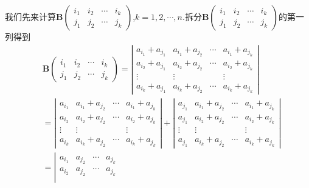 \documentclass[lang=cn,newtx,10pt,scheme=chinese]{elegantbook}
\begin{document}
\begin{solution}
    我们先来计算\(\boldsymbol{B}\left(\begin{matrix}
    i_1 & i_2 & \cdots & i_k\\
    j_1 & j_2 & \cdots & j_k
    \end{matrix}\right)\),\(k = 1,2,\cdots,n\).拆分\(\boldsymbol{B}\left(\begin{matrix}
    i_1 & i_2 & \cdots & i_k\\
    j_1 & j_2 & \cdots & j_k
    \end{matrix}\right)\)的第一列得到
    \begin{align*}
        &\boldsymbol{B}\left(\begin{matrix}
    i_1 & i_2 & \cdots & i_k\\
    j_1 & j_2 & \cdots & j_k
    \end{matrix}\right) = \left|\begin{matrix}
    a_{i_1} + a_{j_1} & a_{i_1} + a_{j_2} & \cdots & a_{i_1} + a_{j_k}\\
    a_{i_2} + a_{j_1} & a_{i_2} + a_{j_2} & \cdots & a_{i_2} + a_{j_k}\\
    \vdots & \vdots &  & \vdots\\
    a_{i_k} + a_{j_1} & a_{i_k} + a_{j_2} & \cdots & a_{i_k} + a_{j_k}
\end{matrix}\right|
    \\
    &=\left|\begin{matrix}
    a_{i_1} & a_{i_1} + a_{j_2} & \cdots & a_{i_1} + a_{j_k}\\
    a_{i_2} & a_{i_2} + a_{j_2} & \cdots & a_{i_2} + a_{j_k}\\
    \vdots & \vdots &  & \vdots\\
    a_{i_k} & a_{i_k} + a_{j_2} & \cdots & a_{i_k} + a_{j_k}
    \end{matrix}\right| + \left|\begin{matrix}
    a_{j_1} & a_{i_1} + a_{j_2} & \cdots & a_{i_1} + a_{j_k}\\
    a_{j_1} & a_{i_2} + a_{j_2} & \cdots & a_{i_2} + a_{j_k}\\
    \vdots & \vdots &  & \vdots\\
    a_{j_1} & a_{i_k} + a_{j_2} & \cdots & a_{i_k} + a_{j_k}
    \end{matrix}\right|
    \\
    &=\left|\begin{matrix}
    a_{i_1} & a_{j_2} & \cdots & a_{j_k}\\
    a_{i_2} & a_{j_2} & \cdots & a_{j_k}\\

\end{matrix}
\end{align*}
\end{solution}
\end{document}
